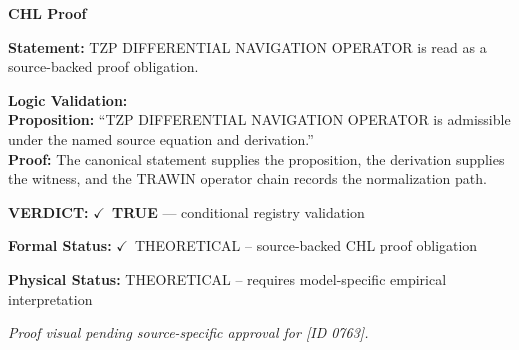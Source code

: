 \vspace{0.45em}
\noindent\textbf{CHL Proof}\par
\textbf{Statement:} TZP DIFFERENTIAL NAVIGATION OPERATOR is read as a source-backed proof obligation.

\textbf{Logic Validation:}\\
\textbf{Proposition:} ``TZP DIFFERENTIAL NAVIGATION OPERATOR is admissible under the named source equation and derivation.''\\
\textbf{Proof:} The canonical statement supplies the proposition, the derivation supplies the witness, and the TRAWIN operator chain records the normalization path.

\textbf{VERDICT:} \ensuremath{\checkmark}\ \textbf{TRUE} --- conditional registry validation

\textbf{Formal Status:} \ensuremath{\checkmark}\ THEORETICAL -- source-backed CHL proof obligation

\textbf{Physical Status:} THEORETICAL -- requires model-specific empirical interpretation
\par\vspace{0.45em}
\par
\vfill
\begingroup\footnotesize\itshape
Proof visual pending source-specific approval for [ID 0763].
\par\endgroup
\vfill
\endgroup
\endgroup

